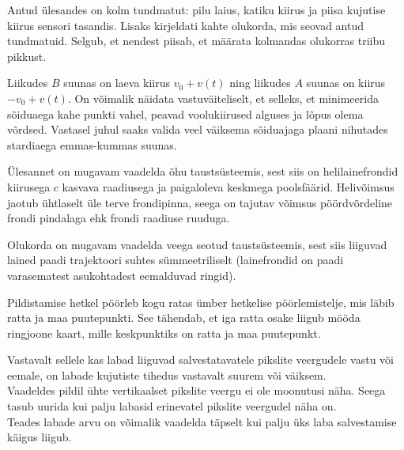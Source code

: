 \documentclass[10pt, twoside]{article}
\begin{document}
{
\hint
Antud ülesandes on kolm tundmatut: pilu laius, katiku kiirus ja piisa kujutise kiirus sensori tasandis. Lisaks kirjeldati kahte olukorda, mis seovad antud tundmatuid. Selgub, et nendest piisab, et määrata kolmandas olukorras triibu pikkust.
\probend
\bigskip


\hint
Liikudes $B$ suunas on laeva kiirus $v_0 + v(t)$ ning liikudes $A$ suunas on kiirus $-v_0 + v(t)$. On võimalik näidata vastuväiteliselt, et selleks, et minimeerida sõiduaega kahe punkti vahel, peavad voolukiirused alguses ja lõpus olema võrdsed. Vastasel juhul saaks valida veel väiksema sõiduajaga plaani nihutades stardiaega emmas-kummas suunas.
\probend
\bigskip


\hint
Ülesannet on mugavam vaadelda õhu taustsüsteemis, sest siis on helilainefrondid kiirusega $c$ kasvava raadiusega ja paigaloleva keskmega poolsfäärid. Helivõimsus jaotub ühtlaselt üle terve frondipinna, seega on tajutav võimsus pöördvõrdeline frondi pindalaga ehk frondi raadiuse ruuduga.
\probend
\bigskip


\hint
Olukorda on mugavam vaadelda veega seotud taustsüsteemis, sest siis liiguvad lained paadi trajektoori suhtes sümmeetriliselt (lainefrondid on paadi varasematest asukohtadest eemalduvad ringid).
\probend
\bigskip


\hint
Pildistamise hetkel pöörleb kogu ratas ümber hetkelise pöörlemistelje, mis läbib
ratta ja maa puutepunkti. See tähendab, et iga ratta osake liigub mööda ringjoone kaart, mille keskpunktiks on ratta ja maa puutepunkt.
\probend
\bigskip


\hint
\osa
Vastavalt sellele kas labad liiguvad salvestatavatele pikslite veergudele vastu või eemale, on labade kujutiste tihedus vastavalt suurem või väiksem.\\
\osa
Vaadeldes pildil ühte vertikaalset pikslite veergu ei ole moonutusi näha. Seega tasub uurida kui palju labasid erinevatel pikslite veergudel näha on.\\
\osa
Teades labade arvu on võimalik vaadelda täpselt kui palju üks laba salvestamise käigus liigub.
\probend
\bigskip

}
\end{document}
